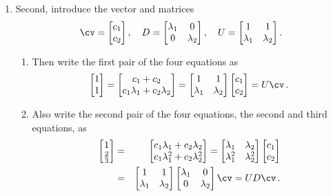 \begin{draft}
\begin{example}
\begin{solution}
\begin{enumerate}
\item \label{eg:2expfitb}
Second, introduce the vector and matrices
\begin{equation*}
\cv=\begin{bmatrix} c_1\\c_2 \end{bmatrix},\quad
D=\begin{bmatrix} \lambda_1&0\\0&\lambda_2 \end{bmatrix},\quad
U=\begin{bmatrix} 1&1\\\lambda_1&\lambda_2 \end{bmatrix}.
\end{equation*}
\begin{enumerate}
\item Then write the first pair of the four equations as
\begin{equation*}
\begin{bmatrix} 1\\1 \end{bmatrix}
=\begin{bmatrix} c_1+c_2\\ c_1\lambda_1+c_2\lambda_2\end{bmatrix}
=\begin{bmatrix} 1&1\\\lambda_1&\lambda_2 \end{bmatrix}\begin{bmatrix} c_1\\c_2 \end{bmatrix}
=U\cv\,.
\end{equation*}

\item Also write the second pair of the four equations, the second and third equations, as
\begin{eqnarray*}
\begin{bmatrix} 1\\\frac23 \end{bmatrix}
&=&\begin{bmatrix} c_1\lambda_1+c_2\lambda_2\\c_1\lambda_1^2+c_2\lambda_2^2\end{bmatrix}
=\begin{bmatrix} \lambda_1&\lambda_2\\\lambda_1^2&\lambda_2^2 \end{bmatrix}\begin{bmatrix} c_1\\c_2 \end{bmatrix}
\\&=&\begin{bmatrix} 1&1\\\lambda_1&\lambda_2 \end{bmatrix}
\begin{bmatrix} \lambda_1&0\\0&\lambda_2 \end{bmatrix}\cv
=UD\cv\,.
\end{eqnarray*}


\end{enumerate}
\end{enumerate}
\end{solution}
\end{example}
\end{draft}
